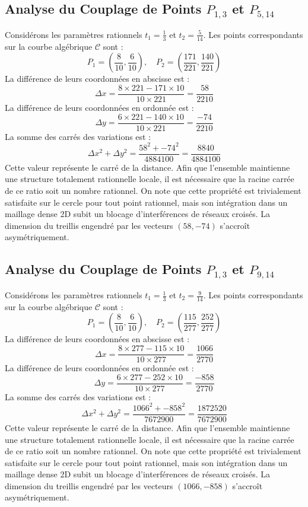 \documentclass[12pt, a4paper]{article}
\begin{document}
\subsection{Analyse du Couplage de Points $P_{1,3}$ et $P_{5,14}$}
Considérons les paramètres rationnels $t_1 = \frac{1}{3}$ et $t_2 = \frac{5}{14}$.
Les points correspondants sur la courbe algébrique $\mathcal{C}$ sont :
$$ P_1 = \left( \frac{8}{10}, \frac{6}{10} \right), \quad P_2 = \left( \frac{171}{221}, \frac{140}{221} \right) $$
La différence de leurs coordonnées en abscisse est :
$$ \Delta x = \frac{8 \times 221 - 171 \times 10}{10 \times 221} = \frac{58}{2210} $$
La différence de leurs coordonnées en ordonnée est :
$$ \Delta y = \frac{6 \times 221 - 140 \times 10}{10 \times 221} = \frac{-74}{2210} $$
La somme des carrés des variations est :
$$ \Delta x^2 + \Delta y^2 = \frac{ 58^2 + -74^2 }{ 4884100 } = \frac{ 8840 }{ 4884100 } $$
Cette valeur représente le carré de la distance. Afin que l'ensemble maintienne une structure totalement rationnelle locale, il est nécessaire que la racine carrée de ce ratio soit un nombre rationnel. On note que cette propriété est trivialement satisfaite sur le cercle pour tout point rationnel, mais son intégration dans un maillage dense 2D subit un blocage d'interférences de réseaux croisés. La dimension du treillis engendré par les vecteurs $( 58, -74 )$ s'accroît asymétriquement.


\subsection{Analyse du Couplage de Points $P_{1,3}$ et $P_{9,14}$}
Considérons les paramètres rationnels $t_1 = \frac{1}{3}$ et $t_2 = \frac{9}{14}$.
Les points correspondants sur la courbe algébrique $\mathcal{C}$ sont :
$$ P_1 = \left( \frac{8}{10}, \frac{6}{10} \right), \quad P_2 = \left( \frac{115}{277}, \frac{252}{277} \right) $$
La différence de leurs coordonnées en abscisse est :
$$ \Delta x = \frac{8 \times 277 - 115 \times 10}{10 \times 277} = \frac{1066}{2770} $$
La différence de leurs coordonnées en ordonnée est :
$$ \Delta y = \frac{6 \times 277 - 252 \times 10}{10 \times 277} = \frac{-858}{2770} $$
La somme des carrés des variations est :
$$ \Delta x^2 + \Delta y^2 = \frac{ 1066^2 + -858^2 }{ 7672900 } = \frac{ 1872520 }{ 7672900 } $$
Cette valeur représente le carré de la distance. Afin que l'ensemble maintienne une structure totalement rationnelle locale, il est nécessaire que la racine carrée de ce ratio soit un nombre rationnel. On note que cette propriété est trivialement satisfaite sur le cercle pour tout point rationnel, mais son intégration dans un maillage dense 2D subit un blocage d'interférences de réseaux croisés. La dimension du treillis engendré par les vecteurs $( 1066, -858 )$ s'accroît asymétriquement.
\end{document}
